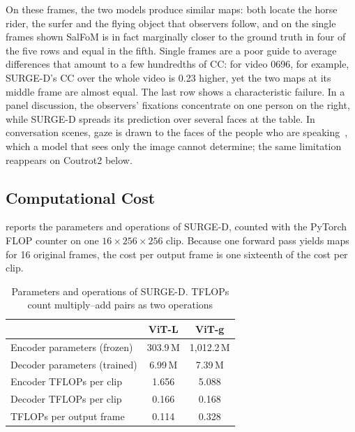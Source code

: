 On these frames, the two models produce similar maps: both locate the horse
rider, the surfer and the flying object that observers follow, and on the
single frames shown SalFoM is in fact marginally closer to the ground truth in
four of the five rows and equal in the fifth. Single frames are a poor guide to
average differences that amount to a few hundredths of \acrshort{CC}: for video 0696, for
example, SURGE-D's \acrshort{CC} over the whole video is 0.23 higher, yet the two maps at
its middle frame are almost equal. The last row shows a characteristic failure.
In a panel discussion, the observers' fixations concentrate on one person on
the right, while SURGE-D spreads its prediction over several faces at the
table. In conversation scenes, gaze is drawn to the faces of the people who are
speaking~\cite{coutrot2014how}, which a model that sees only the image cannot
determine; the same limitation reappears on Coutrot2 below.

\subsection{Computational Cost}\label{sec:cost}

 reports the parameters and operations of SURGE-D, counted with
the PyTorch FLOP counter on one $16\times256\times256$ clip. Because one
forward pass yields maps for 16 original frames, the cost per output frame is
one sixteenth of the cost per clip.

\begin{table}[htbp]
  \centering
  \caption{Parameters and operations of SURGE-D. \acrshort{TFLOPs} count
  multiply--add pairs as two operations}\label{tab:cost}
  \small
  \begin{tabular}{@{}lcc@{}}
    \toprule
    & \textbf{\acrshort{ViT}-L} & \textbf{\acrshort{ViT}-g} \\
    \midrule
    Encoder parameters (frozen)                & 303.9\,M & 1,012.2\,M \\
    Decoder parameters (trained)               & 6.99\,M & 7.39\,M \\
    Encoder \acrshort{TFLOPs} per clip                    & 1.656 & 5.088 \\
    Decoder \acrshort{TFLOPs} per clip                    & 0.166 & 0.168 \\
    \acrshort{TFLOPs} per output frame                    & 0.114 & 0.328 \\
    \bottomrule
  \end{tabular}
\end{table}

